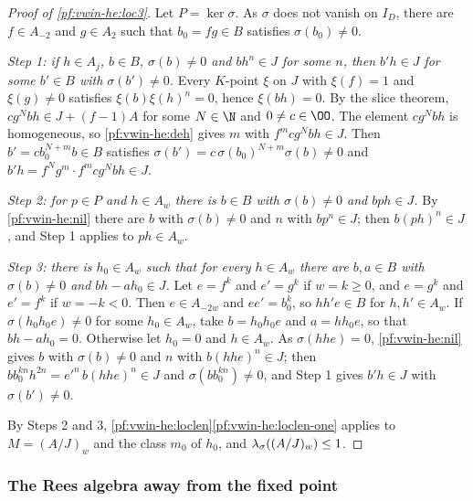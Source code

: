 \begin{proof}[Proof of \cref{pf:vwin-he:loc3}]
Let $P=\ker\sigma$. As $\sigma$ does not vanish on $I_D$, there are $f\in A_{-2}$ and $g\in A_2$ such that
$b_0=fg\in B$ satisfies $\sigma(b_0)\ne0$.

\emph{Step 1: if $h\in A_j$, $b\in B$, $\sigma(b)\ne0$ and $bh^n\in J$ for some $n$, then $b'h\in J$ for some
$b'\in B$ with $\sigma(b')\ne0$.} Every $K$-point $\xi$ on $J$ with $\xi(f)=1$ and $\xi(g)\ne0$ satisfies
$\xi(b)\xi(h)^n=0$, hence $\xi(bh)=0$. By the slice theorem, $cg^Nbh\in J+(f-1)A$ for some $N\in\N$ and
$0\ne c\in\OO$. The element $cg^Nbh$ is homogeneous, so \cref{pf:vwin-he:deh} gives $m$ with $f^mcg^Nbh\in J$. Then
$b'=cb_0^{N+m}b\in B$ satisfies $\sigma(b')=c\,\sigma(b_0)^{N+m}\sigma(b)\ne0$ and
$b'h=f^Ng^m\cdot f^mcg^Nbh\in J$.

\emph{Step 2: for $p\in P$ and $h\in A_w$ there is $b\in B$ with $\sigma(b)\ne0$ and $bph\in J$.} By
\cref{pf:vwin-he:nil} there are $b$ with $\sigma(b)\ne0$ and $n$ with $bp^n\in J$; then $b(ph)^n\in J$, and Step 1
applies to $ph\in A_w$.

\emph{Step 3: there is $h_0\in A_w$ such that for every $h\in A_w$ there are $b,a\in B$ with $\sigma(b)\ne0$ and
$bh-ah_0\in J$.} Let $e=f^k$ and $e'=g^k$ if $w=k\ge0$, and $e=g^k$ and $e'=f^k$ if $w=-k<0$. Then $e\in A_{-2w}$ and
$ee'=b_0^k$, so $hh'e\in B$ for $h,h'\in A_w$. If $\sigma(h_0h_0e)\ne0$ for some $h_0\in A_w$, take $b=h_0h_0e$ and
$a=hh_0e$, so that $bh-ah_0=0$. Otherwise let $h_0=0$ and $h\in A_w$. As $\sigma(hhe)=0$, \cref{pf:vwin-he:nil} gives
$b$ with $\sigma(b)\ne0$ and $n$ with $b(hhe)^n\in J$; then $bb_0^{kn}h^{2n}=e'^n\,b(hhe)^n\in J$ and
$\sigma(bb_0^{kn})\ne0$, and Step 1 gives $b'h\in J$ with $\sigma(b')\ne0$.

By Steps 2 and 3, \cref{pf:vwin-he:loclen}\ref{pf:vwin-he:loclen-one} applies to $M=(A/J)_w$ and the class $m_0$ of
$h_0$, and $\lambda_\sigma((A/J)_w)\le1$.
\end{proof}

\subsubsection{The Rees algebra away from the fixed point}\label{sec:pf:vwin-he:pf-rees}

